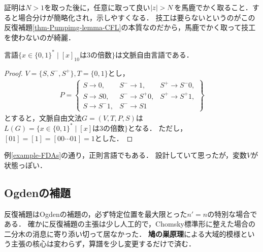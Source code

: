 \documentclass[uplatex, dvipdfmx]{jsreport}
\begin{document}
\begin{remarks}
    証明は$N>1$を取った後に，任意に取って良い$\lvert z\rvert>N$を馬鹿でかく取ること．すると場合分けが簡略化され，示しやすくなる．
    技工は要らないというのがこの反復補題\ref{thm-Pumpimg-lemma-CFL}の本質なのだから，馬鹿でかく取って技工を使わないのが綺麗．
\end{remarks}

\begin{proposition}
    言語$\{x\in\{0,1\}^*\mid [x]_{10}は3の倍数\}$は文脈自由言語である．
\end{proposition}
\begin{proof}
    $V=\{S,S^-,S^+\},T=\{0,1\}$とし，
    \begin{align*}
        P=\left\{\begin{array}{lll}
            S\to 0,&S^-\to 1,&S^+\to S^-0,\\
            S\to S0,&S^-\to S^+0,&S^+\to S^+1,\\
            S\to S^-1,&S^-\to S1
        \end{array}\right\}
    \end{align*}
    とすると，文脈自由文法$G=(V,T,P,S)$は$L(G)=\{x\in\{0,1\}^*\mid [x]は3の倍数\}$となる．
    ただし，$[01]=[1]=[00\cdots 01]=1$とした．
\end{proof}
\begin{remarks}
    例\ref{example-FDAs}の通り，正則言語でもある．
    設計していて思ったが，変数$V$が状態っぽい．
\end{remarks}

\subsection{Ogdenの補題}

\begin{tcolorbox}[colframe=ForestGreen, colback=ForestGreen!10!white, breakable]
    反復補題はOgdenの補題の，必ず特定位置を最大限とった$n'=n$の特別な場合である．
    確かに反復補題の主張は少し人工的で，Chomsky標準形に整えた場合の二分木の消息に寄り添い切って居なかった．
    \textbf{鳩の巣原理}による大域的模様という主張の核心は変わらず，算譜を少し変更するだけで済む．
\end{tcolorbox}
\end{document}
